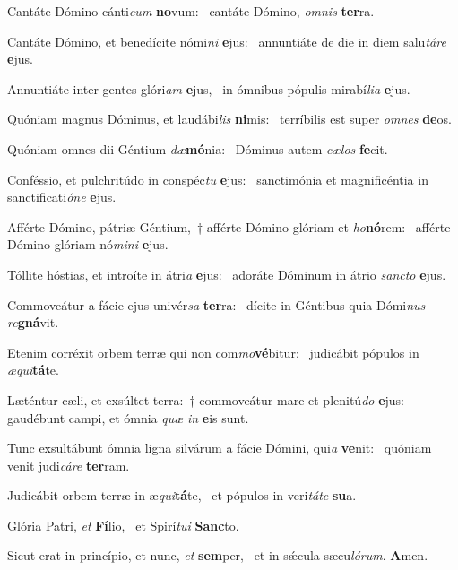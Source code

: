\item Cantáte Dómino cánti\textit{cum} \textbf{no}vum:~\psstar{} cantáte Dómino, \textit{omnis} \textbf{ter}ra.
\item Cantáte Dómino, et benedícite nómi\textit{ni} \textbf{e}jus:~\psstar{} annuntiáte de die in diem salu\textit{táre} \textbf{e}jus.
\item Annuntiáte inter gentes glóri\textit{am} \textbf{e}jus,~\psstar{} in ómnibus pópulis mirabí\textit{lia} \textbf{e}jus.
\item Quóniam magnus Dóminus, et laudábi\textit{lis} \textbf{ni}mis:~\psstar{} terríbilis est super \textit{omnes} \textbf{de}os.
\item Quóniam omnes dii Géntium \textit{dæ}\textbf{mó}nia:~\psstar{} Dóminus autem \textit{cælos} \textbf{fe}cit.
\item Conféssio, et pulchritúdo in conspéc\textit{tu} \textbf{e}jus:~\psstar{} sanctimónia et magnificéntia in sanctificati\textit{óne} \textbf{e}jus.
\item Afférte Dómino, pátriæ Géntium,~† afférte Dómino glóriam et \textit{ho}\textbf{nó}rem:~\psstar{} afférte Dómino glóriam nó\textit{mini} \textbf{e}jus.
\item Tóllite hóstias, et introíte in átri\textit{a} \textbf{e}jus:~\psstar{} adoráte Dóminum in átrio \textit{sancto} \textbf{e}jus.
\item Commoveátur a fácie ejus univér\textit{sa} \textbf{ter}ra:~\psstar{} dícite in Géntibus quia Dómi\textit{nus} \textit{re}\textbf{gná}vit.
\item Etenim corréxit orbem terræ qui non com\textit{mo}\textbf{vé}bitur:~\psstar{} judicábit pópulos in \textit{æqui}\textbf{tá}te.
\item Læténtur cæli, et exsúltet terra:~† commoveátur mare et plenitú\textit{do} \textbf{e}jus:~\psstar{} gaudébunt campi, et ómnia \textit{quæ} \textit{in} \textbf{e}is sunt.
\item Tunc exsultábunt ómnia ligna silvárum a fácie Dómini, qui\textit{a} \textbf{ve}nit:~\psstar{} quóniam venit judi\textit{cáre} \textbf{ter}ram.
\item Judicábit orbem terræ in æ\textit{qui}\textbf{tá}te,~\psstar{} et pópulos in veri\textit{táte} \textbf{su}a.
\item Glória Patri, \textit{et} \textbf{Fí}lio,~\psstar{} et Spirí\textit{tui} \textbf{Sanc}to.
\item Sicut erat in princípio, et nunc, \textit{et} \textbf{sem}per,~\psstar{} et in sǽcula sæcu\textit{lórum}. \textbf{A}men.